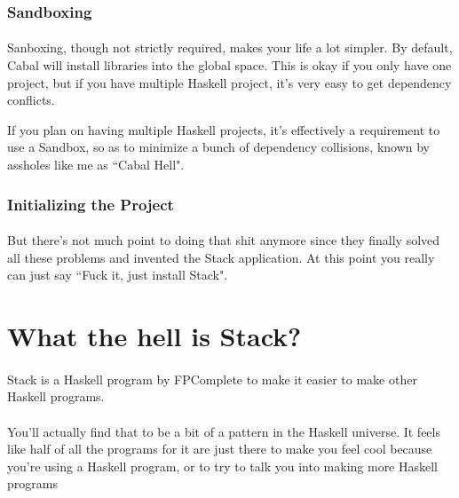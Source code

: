 \subsubsection{Sandboxing}
\paragraph{}
Sanboxing, though not strictly required, makes your life a lot simpler. By default, Cabal will install libraries into the global space.  This is okay if you only have one project, but if you have multiple Haskell project, it's very easy to get dependency conflicts. 

If you plan on having multiple Haskell projects, it's effectively a requirement to use a Sandbox, so as to minimize a bunch of dependency collisions, known by assholes like me as ``Cabal Hell".  

\subsubsection{Initializing the Project}
\paragraph{}


\paragraph{}
But there's not much point to doing that shit anymore since they finally solved all these problems and invented the Stack application.  At this point you really can just say ``Fuck it, just install Stack". 

\section{What the hell is Stack?}

\paragraph{}
Stack is a Haskell program by FPComplete to make it easier to make other Haskell programs.  

\paragraph{}
You'll actually find that to be a bit of a pattern in the Haskell universe.  It feels like half of all the programs for it are just there to make you feel cool because you're using a Haskell program, or to try to talk you into making more Haskell programs

